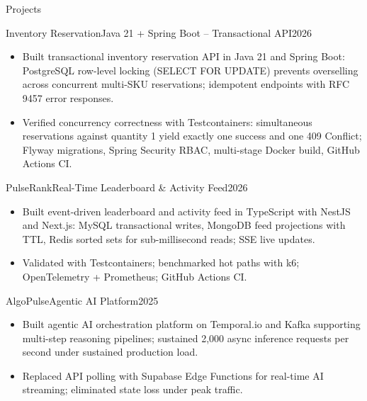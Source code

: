 \documentclass[]{mcdowellcv}
\begin{document}
\begin{cvsection}{Projects}
  \begin{cvsubsection}{Inventory Reservation}{Java 21 + Spring Boot -- Transactional API}{2026}
    \begin{itemize}
      \item Built transactional inventory reservation API in Java 21 and Spring Boot: PostgreSQL row-level locking (SELECT FOR UPDATE) prevents overselling across concurrent multi-SKU reservations; idempotent endpoints with RFC 9457 error responses.
      \item Verified concurrency correctness with Testcontainers: simultaneous reservations against quantity 1 yield exactly one success and one 409 Conflict; Flyway migrations, Spring Security RBAC, multi-stage Docker build, GitHub Actions CI.
    \end{itemize}
    \vspace{-1.5pt}
  \end{cvsubsection}

  \begin{cvsubsection}{PulseRank}{Real-Time Leaderboard \& Activity Feed}{2026}
    \begin{itemize}
      \item Built event-driven leaderboard and activity feed in TypeScript with NestJS and Next.js: MySQL transactional writes, MongoDB feed projections with TTL, Redis sorted sets for sub-millisecond reads; SSE live updates.
      \item Validated with Testcontainers; benchmarked hot paths with k6; OpenTelemetry + Prometheus; GitHub Actions CI.
    \end{itemize}
    \vspace{-1.5pt}
  \end{cvsubsection}

  \begin{cvsubsection}{AlgoPulse}{Agentic AI Platform}{2025}
    \begin{itemize}
      \item Built agentic AI orchestration platform on Temporal.io and Kafka supporting multi-step reasoning pipelines; sustained 2,000 async inference requests per second under sustained production load.
      \item Replaced API polling with Supabase Edge Functions for real-time AI streaming; eliminated state loss under peak traffic.
    \end{itemize}
    \vspace{-1.5pt}
  \end{cvsubsection}


\end{cvsection}
\end{document}
